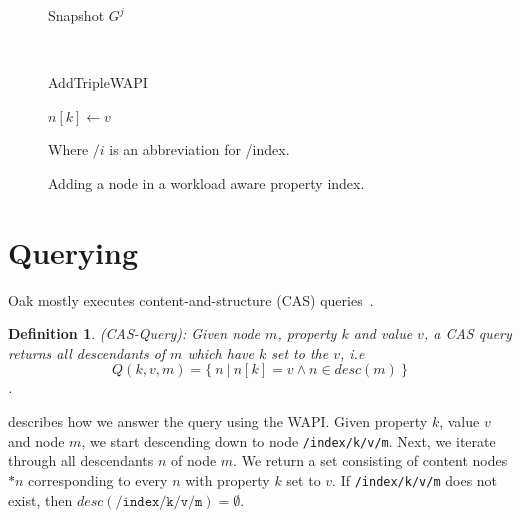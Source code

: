 \documentclass[abstracton,12pt]{scrreprt}
\newtheorem{definition}{Definition}
\begin{document}
\begin{figure}[h]
\begin{multicols}{2}
\begin{scriptsize}
\begin{multicols}{2}
\begin{center}
                        Snapshot $G^j$
                    \end{center}    
                \end{multicols}
            \end{scriptsize}
            \columnbreak
            ~

            \vspace{7.8mm}
            \begin{algorithm}[H]
                \label{algo:add_triple_wapi}
                \caption{AddTripleWAPI}
                \DontPrintSemicolon
                \begin{footnotesize}
                    \vspace{2.6mm}
                    $n[k] \longleftarrow v$
                \end{footnotesize}
            \end{algorithm}
            \begin{scriptsize}
                Where $/i$ is an abbreviation for /index.
            \end{scriptsize}
        \end{multicols}
    \vspace{-8mm}
    \caption{Adding a node in a workload aware property index.}
    \label{fig:add_wapi}
\end{figure}

\newpage

\section{Querying}

Oak mostly executes content-and-structure (CAS) queries~\cite{CM15}.

\begin{definition}
    (CAS-Query): Given node $m$, property $k$ and value $v$, a CAS query returns all descendants of $m$ which have $k$ set to the $v$, 
    i.e $$ Q(k,v,m) = \{~n~|~n[k] = v \land n \in desc(m)~\}$$.
\end{definition}

 describes how we answer the query using the WAPI.
Given property $k$, value $v$ and node $m$, we start descending down to node \texttt{/index/k/v/m}.
Next, we iterate through all descendants $n$ of node $m$.
We return a set consisting of content nodes $*n$ corresponding to every $n$ with property $k$ set to $v$.
If \texttt{/index/k/v/m} does not exist, then $desc(\texttt{/index/k/v/m}) = \emptyset$.
\end{document}
